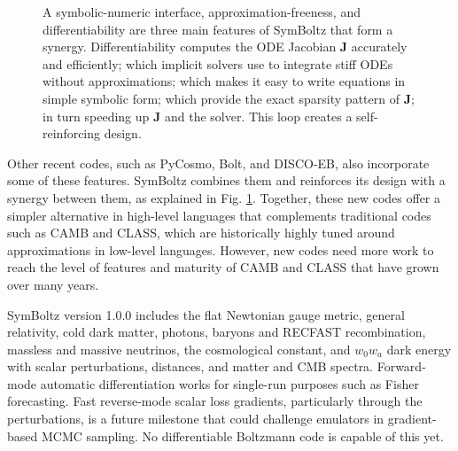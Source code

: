 \documentclass{aa}
\begin{document}
\begin{figure}
    \centering
    \caption{%
        A symbolic-numeric interface, approximation-freeness, and differentiability are three main features of SymBoltz that form a synergy.
        Differentiability computes the ODE Jacobian $\boldsymbol{J}$ accurately and efficiently; which implicit solvers use to integrate stiff ODEs without approximations; which makes it easy to write equations in simple symbolic form; which provide the exact sparsity pattern of $\boldsymbol{J}$; in turn speeding up $\boldsymbol{J}$ and the solver.
        This loop creates a self-reinforcing design.
    }
    \label{fig:synergy}
\end{figure}

Other recent codes, such as PyCosmo, Bolt, and DISCO-EB, also incorporate some of these features.
SymBoltz combines them and reinforces its design with a synergy between them, as explained in Fig. \ref{fig:synergy}.
Together, these new codes offer a simpler alternative in high-level languages
that complements traditional codes such as CAMB and CLASS, which are historically highly tuned around approximations in low-level languages.
However, new codes need more work to reach the level of features and maturity of CAMB and CLASS that have grown over many years.

SymBoltz version 1.0.0 includes the flat Newtonian gauge metric, general relativity, cold dark matter, photons, baryons and RECFAST recombination, massless and massive neutrinos, the cosmological constant, and $w_0 w_a$ dark energy with scalar perturbations, distances, and matter and CMB spectra.
Forward-mode automatic differentiation works for single-run purposes such as Fisher forecasting.
Fast reverse-mode scalar loss gradients, particularly through the perturbations,
is a future milestone that could challenge emulators in gradient-based MCMC sampling.
No differentiable Boltzmann code is capable of this yet.
\end{document}
